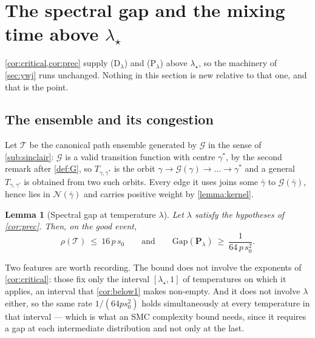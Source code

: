 \documentclass[aos]{imsart}
\theoremstyle{plain}
\newtheorem{lemma}{Lemma}[section]
\theoremstyle{definition}
\begin{document}


    \section{The spectral gap and the mixing time above $\lambda_\star$}
    \label{sec:gap}

    \cref{cor:critical,cor:prec} supply (D$_\lambda$) and (P$_\lambda$)
    above $\lambda_\star$, so the machinery of \cref{sec:ywj} runs
    unchanged. Nothing in this section is new relative to that one, and that
    is the point.

    \subsection{The ensemble and its congestion}
    \label{sub:congestion}

    Let $\mathcal{T}$ be the canonical path ensemble generated by
    $\mathcal{G}$ in the sense of \cref{sub:sinclair}: $\mathcal{G}$ is a
    valid transition function with centre $\gamma^{\ast}$, by the second
    remark after \cref{def:G}, so $T_{\gamma,\gamma^{\ast}}$ is the orbit
    $\gamma\to\mathcal{G}(\gamma)\to\dots\to\gamma^{\ast}$ and a general
    $T_{\gamma,\gamma'}$ is obtained from two such orbits. Every edge it
    uses joins some $\bar\gamma$ to $\mathcal{G}(\bar\gamma)$, hence lies in
    $\mathcal{N}(\bar\gamma)$ and carries positive weight by
    \cref{lemma:kernel}.

    \begin{lemma}[Spectral gap at temperature $\lambda$]
        \label{lemma:gap}
        Let $\lambda$ satisfy the hypotheses of \cref{cor:prec}. Then, on
        the good event,
        \begin{equation}
            \label{eq:gap}
            \rho(\mathcal{T})\ \leq\ 16\,p\,s_0
            \qquad\text{and}\qquad
            \mathrm{Gap}(\mathbf{P}_\lambda)\ \geq\ \frac{1}{64\,p\,s_0^{2}} .
        \end{equation}
    \end{lemma}


    Two features are worth recording. The bound does not involve the
    exponents of \cref{cor:critical}: those fix only the interval
    $[\lambda_\star,1]$ of temperatures on which it applies, an interval
    that \cref{cor:below1} makes non-empty. And it does not involve
    $\lambda$ either, so the
    same rate $1/(64ps_0^{2})$ holds simultaneously at every temperature in
    that interval --- which is what an SMC complexity bound needs, since it
    requires a gap at each intermediate distribution and not only at the
    last.
\end{document}
